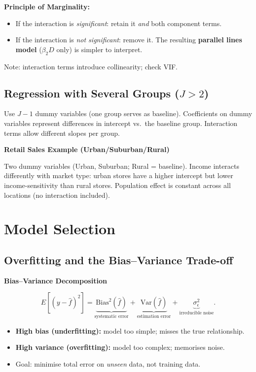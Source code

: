 \documentclass[12pt, a4paper]{article}
\begin{document}
\textbf{Principle of Marginality:}
\begin{itemize}
  \item If the interaction is \emph{significant}: retain it \emph{and} both component terms.
  \item If the interaction is \emph{not significant}: remove it. The resulting \textbf{parallel lines model} ($\beta_2 D$ only) is simpler to interpret.
\end{itemize}

Note: interaction terms introduce collinearity; check VIF.

\subsection{Regression with Several Groups ($J > 2$)}

Use $J - 1$ dummy variables (one group serves as baseline). Coefficients on dummy variables represent differences in intercept vs.\ the baseline group. Interaction terms allow different slopes per group.

\begin{examplebox}
\noindent\textbf{Retail Sales Example (Urban/Suburban/Rural)}\par\smallskip
Two dummy variables (Urban, Suburban; Rural = baseline). Income interacts differently with market type: urban stores have a higher intercept but lower income-sensitivity than rural stores. Population effect is constant across all locations (no interaction included).
\end{examplebox}

\section{Model Selection}

\subsection{Overfitting and the Bias--Variance Trade-off}

\begin{keybox}
\noindent\textbf{Bias--Variance Decomposition}\par\smallskip
\[
  E\!\left[(y - \hat{f})^2\right] = \underbrace{\text{Bias}^2(\hat{f})}_{\text{systematic error}}
  + \underbrace{\text{Var}(\hat{f})}_{\text{estimation error}}
  + \underbrace{\sigma_\epsilon^2}_{\text{irreducible noise}}.
\]
\begin{itemize}
  \item \textbf{High bias (underfitting):} model too simple; misses the true relationship.
  \item \textbf{High variance (overfitting):} model too complex; memorises noise.
  \item Goal: minimise total error on \emph{unseen} data, not training data.
\end{itemize}
\end{keybox}
\end{document}

